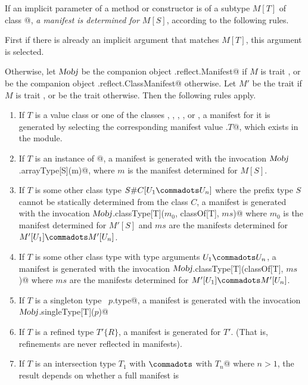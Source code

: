 If an implicit parameter of a method or constructor is of a subtype $M[T]$ of
class \lstinline@OptManifest[T]@, {\em a manifest is determined for $M[S]$},
according to the following rules.

First if there is already an implicit argument that matches $M[T]$, this
argument is selected.

Otherwise, let $\mbox{\sl Mobj}$ be the companion object \lstinline@scala.reflect.Manifest@
if $M$ is trait \lstinline@Manifest@, or be
the companion object \lstinline@scala.reflect.ClassManifest@ otherwise. Let $M'$ be the trait
\lstinline@Manifest@ if $M$ is trait \lstinline@Manifest@, or be the trait \lstinline@OptManifest@ otherwise.  
Then the following rules apply.


\begin{enumerate}
\item
If $T$ is a value class or one of the classes \lstinline@Any@, \lstinline@AnyVal@, \lstinline@Object@, 
\lstinline@Null@, or \lstinline@Nothing@,
a manifest for it is generated by selecting
the corresponding manifest value \lstinline@Manifest.$T$@, which exists in the
\lstinline@Manifest@ module.
\item
If $T$ is an instance of \lstinline@Array[$S$]@, a manifest is generated
with the invocation \lstinline@$\mbox{\sl Mobj}$.arrayType[S](m)@, where $m$ is the manifest
determined for $M[S]$.
\item
If $T$ is some other class type $S\#C[U_1 \commadots U_n]$ where the prefix type $S$ 
cannot be statically determined from the class $C$, 
a manifest is generated 
with the invocation \lstinline@$\mbox{\sl Mobj}$.classType[T]($m_0$, classOf[T], $ms$)@
where $m_0$ is the manifest determined for $M'[S]$ and $ms$ are the
manifests determined for $M'[U_1] \commadots M'[U_n]$.
\item
If $T$ is some other class type with type arguments $U_1 \commadots U_n$, 
a manifest is generated 
with the invocation \lstinline@$\mbox{\sl Mobj}$.classType[T](classOf[T], $ms$)@
where $ms$ are the
manifests determined for $M'[U_1] \commadots M'[U_n]$.
\item 
If $T$ is a singleton type ~\lstinline@$p$.type@, a manifest is generated with 
the invocation
\lstinline@$\mbox{\sl Mobj}$.singleType[T]($p$)@ 
\item
If $T$ is a refined type $T' \{ R \}$, a manifest is generated for $T'$.
(That is, refinements are never reflected in manifests).
\item
If $T$ is an intersection type 
\lstinline@$T_1$ with $\commadots$ with $T_n$@ 
where $n > 1$, the result depends on whether a full manifest is

\end{enumerate}
